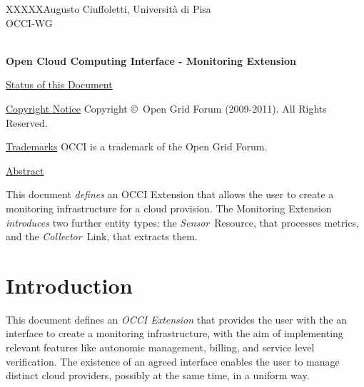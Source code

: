 \documentclass[10pt,a4paper]{article}
\newcommand{\doccode}{XXXXX}
\begin{document}
\thispagestyle{empty}

\doccode \hfill Augusto Ciuffoletti, Università di Pisa\\ 
OCCI-WG\\
\\

\vspace*{0.5in}

\begin{Large}
\textbf{Open Cloud Computing Interface - Monitoring Extension}
\end{Large}

\vspace*{0.5in}

\newcommand{\rem}[2]{}

\newcommand{\oc}[0]{\tt OCCI}
\newcommand{\mi}[0]{{\em mixin}}
\newcommand{\metr}[0]{{\em metric}}
\newcommand{\aggr}[0]{{\em aggregator}}
\newcommand{\publ}[0]{{\em publisher}}
\newcommand{\ent}[0]{{\em Entity}}
\newcommand{\rs}[0]{{\em Resource}}
\renewcommand{\ln}[0]{{\em Link}}
\newcommand{\sens}[0]{{\em Sensor}}
\newcommand{\comp}[0]{{\em Compute}}
\newcommand{\coll}[0]{{\em Collector}}

\underline{Status of this Document}


\underline{Copyright Notice}
Copyright \copyright ~Open Grid Forum (2009-2011). All Rights Reserved.

\underline{Trademarks}
OCCI is a trademark of the Open Grid Forum.

\underline{Abstract}


This document {\em defines} an OCCI Extension that allows the user to create a monitoring infrastructure for a cloud provision. The Monitoring Extension {\em introduces} two further entity types: the \sens\ Resource, that processes metrics, and the \coll\ Link, that extracts them.

\newpage
\tableofcontents
\newpage

\section{Introduction}



This document defines an {\em OCCI Extension} that provides the user with the an interface to create a monitoring infrastructure, with the aim of implementing relevant features like autonomic management, billing, and service level verification. The existence of an agreed interface enables the user to manage distinct cloud providers, possibly at the same time, in a uniform way.
\end{document}
